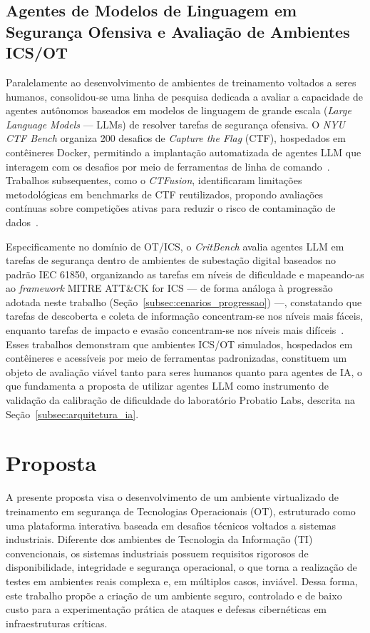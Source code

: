 \documentclass[conference]{IEEEtran}
\begin{document}
\subsection{Agentes de Modelos de Linguagem em Segurança Ofensiva e Avaliação de Ambientes ICS/OT}
\label{subsec:llm_agents_theory}

Paralelamente ao desenvolvimento de ambientes de treinamento voltados a seres humanos, consolidou-se uma linha de pesquisa dedicada a avaliar a capacidade de agentes autônomos baseados em modelos de linguagem de grande escala (\textit{Large Language Models} --- LLMs) de resolver tarefas de segurança ofensiva. O \textit{NYU CTF Bench} organiza 200 desafios de \textit{Capture the Flag} (CTF), hospedados em contêineres Docker, permitindo a implantação automatizada de agentes LLM que interagem com os desafios por meio de ferramentas de linha de comando~\cite{nyuctfbench2024}. Trabalhos subsequentes, como o \textit{CTFusion}, identificaram limitações metodológicas em benchmarks de CTF reutilizados, propondo avaliações contínuas sobre competições ativas para reduzir o risco de contaminação de dados~\cite{ctfusion2026}.

Especificamente no domínio de OT/ICS, o \textit{CritBench} avalia agentes LLM em tarefas de segurança dentro de ambientes de subestação digital baseados no padrão IEC 61850, organizando as tarefas em níveis de dificuldade e mapeando-as ao \textit{framework} MITRE ATT\&CK for ICS --- de forma análoga à progressão adotada neste trabalho (Seção~\ref{subsec:cenarios_progressao}) ---, constatando que tarefas de descoberta e coleta de informação concentram-se nos níveis mais fáceis, enquanto tarefas de impacto e evasão concentram-se nos níveis mais difíceis~\cite{critbench2026}. Esses trabalhos demonstram que ambientes ICS/OT simulados, hospedados em contêineres e acessíveis por meio de ferramentas padronizadas, constituem um objeto de avaliação viável tanto para seres humanos quanto para agentes de IA, o que fundamenta a proposta de utilizar agentes LLM como instrumento de validação da calibração de dificuldade do laboratório Probatio Labs, descrita na Seção~\ref{subsec:arquitetura_ia}.

\section{Proposta}

A presente proposta visa o desenvolvimento de um ambiente virtualizado de treinamento em segurança de Tecnologias Operacionais (OT), estruturado como uma plataforma interativa baseada em desafios técnicos voltados a sistemas industriais. Diferente dos ambientes de Tecnologia da Informação (TI) convencionais, os sistemas industriais possuem requisitos rigorosos de disponibilidade, integridade e segurança operacional, o que torna a realização de testes em ambientes reais complexa e, em múltiplos casos, inviável. Dessa forma, este trabalho propõe a criação de um ambiente seguro, controlado e de baixo custo para a experimentação prática de ataques e defesas cibernéticas em infraestruturas críticas.
\end{document}
